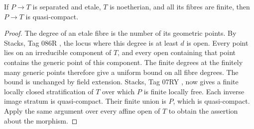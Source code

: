 \begin{lemma}
\label{A:etale-finitefibres-qc}
If $P\to T$ is separated and etale, $T$ is noetherian, and all its
fibres are finite, then $P\to T$ is quasi-compact.
\end{lemma}
\begin{proof}
The degree of an etale fibre is the number of its geometric points.
By Stacks, Tag 086R \cite{Stacks086R}, the locus where this degree
is at least $d$ is open. Every point lies on an irreducible component
of $T$, and every open containing that point contains the generic
point of this component. The finite degrees at the finitely many
generic points therefore give a uniform bound on all fibre degrees.
The bound is unchanged by field extension. Stacks, Tag 07RY
\cite{Stacks07RY}, now gives a finite locally closed stratification
of $T$ over which $P$ is finite locally free. Each inverse image
stratum is quasi-compact. Their finite union is $P$, which is
quasi-compact. Apply the same argument over every affine open of
$T$ to obtain the assertion about the morphism.
\end{proof}

